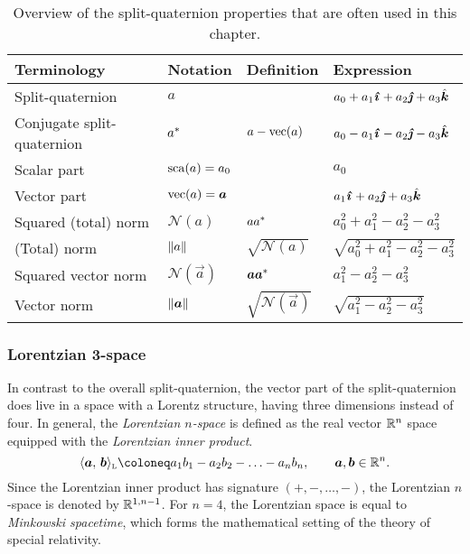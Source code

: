 \renewcommand{\arraystretch}{1.3}
\begin{table}[ht!]
    \centering
    \caption{Overview of the split-quaternion properties that are often used in this chapter.}
    \label{tab:spquat_properties}
    \begin{tabular}{llll}
        \toprule
        \textbf{Terminology} & \textbf{Notation} & \textbf{Definition} & \textbf{Expression} \\
        \midrule
        Split-quaternion & \(a\) & &  \(a_0 + a_1\quati + a_2\quatj + a_3\quatk\) \\
        Conjugate split-quaternion &  \(a^*\) & $ a - \mathrm{vec}\qty(a) $ & \(a_0 - a_1\quati - a_2\quatj - a_3\quatk\)\\
        \midrule
        Scalar part & \(\mathrm{sca}\qty(a) = a_0\) & & \(a_0\) \\
        Vector part & \(\vecpart{a} = \vec{a}\) & & \(a_1\quati + a_2\quatj + a_3\quatk\) \\
        \midrule
        Squared (total) norm & \(\mathscr{N}(a)\) & \(aa^*\) &  
        \(a_0^2 + a_1^2 - a_2^2 - a_3^2\) \\
        (Total) norm & \(\norm{a}\) & \(\sqrt{\mathscr{N}(a)}\) & \(\sqrt{a_0^2 + a_1^2 - a_2^2 - a_3^2}\) \\
        \midrule
        Squared vector norm & \(\mathscr{N}(\vec{a})\) & \( \vec{a}\conj{\vec{a}} \) & \( a_1^2 - a_2^2 - a_3^2 \) \\
        Vector norm & \(\norm{\vec{a}}\) & \(\sqrt{\mathscr{N}(\vec{a})}\) & \(\sqrt{a_1^2 - a_2^2 - a_3^2}\) \\
        \bottomrule
    \end{tabular}
\end{table}
\renewcommand{\arraystretch}{1}
 
\subsubsection{Lorentzian 3-space}
In contrast to the overall split-quaternion, the vector part of the split-quaternion does live in a space with a Lorentz structure, having three dimensions instead of four. In general, the \emph{Lorentzian $n$-space} is defined as the real vector $\mathbb{R}^n$ space equipped with the \emph{Lorentzian inner product}. 
\begin{equation}
     \lorinner{\vec{a}}{\vec{b}} \coloneq a_1b_1 - a_2b_2 - \ldots - a_nb_n, \qquad \vec{a}, \vec{b} \in \real^n.
\end{equation}
Since the Lorentzian inner product has signature $(+, -, \ldots, -)$, the Lorentzian $n$-space is denoted by $\mathbb{R}^{1, n-1}$. For $n = 4$, the Lorentzian space is equal to \emph{Minkowski spacetime}, which forms the mathematical setting of the theory of special relativity. 

